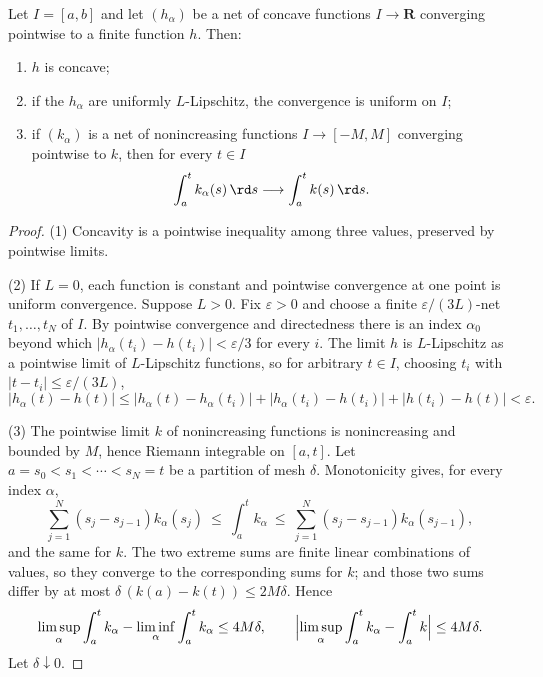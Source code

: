 \begin{lemma}
\label{lem:ch27-concave-nets}
Let $I=[a,b]$ and let $(h_\alpha)$ be a net of concave functions
$I\to\mathbf R$ converging pointwise to a finite function $h$.  Then:
\begin{enumerate}
\item $h$ is concave;
\item if the $h_\alpha$ are uniformly $L$-Lipschitz, the convergence is
uniform on $I$;
\item if $(k_\alpha)$ is a net of nonincreasing functions
$I\to[-M,M]$ converging pointwise to $k$, then for every
$t\in I$
\begin{equation}\label{eq:ch27-helly-integral}
 \int_a^tk_\alpha(s)\,\rd s\longrightarrow\int_a^tk(s)\,\rd s .
\end{equation}
\end{enumerate}
\end{lemma}

\begin{proof}
(1) Concavity is a pointwise inequality among three values, preserved by
pointwise limits.

(2) If $L=0$, each function is constant and pointwise convergence at one
point is uniform convergence.  Suppose $L>0$.  Fix $\varepsilon>0$ and
choose a finite $\varepsilon/(3L)$-net
$t_1,\dots,t_N$ of $I$.  By pointwise convergence and directedness there
is an index $\alpha_0$ beyond which $|h_\alpha(t_i)-h(t_i)|<\varepsilon/3$
for every $i$.  The limit $h$ is $L$-Lipschitz as a pointwise limit of
$L$-Lipschitz functions, so for arbitrary $t\in I$, choosing $t_i$
with $|t-t_i|\leq\varepsilon/(3L)$,
\[
 |h_\alpha(t)-h(t)|
 \leq|h_\alpha(t)-h_\alpha(t_i)|+|h_\alpha(t_i)-h(t_i)|+|h(t_i)-h(t)|
 <\varepsilon .
\]

(3) The pointwise limit $k$ of nonincreasing functions is nonincreasing
and bounded by $M$, hence Riemann integrable on $[a,t]$.  Let
$a=s_0<s_1<\cdots<s_N=t$ be a partition of mesh $\delta$.  Monotonicity
gives, for every index $\alpha$,
\[
 \sum_{j=1}^N(s_j-s_{j-1})k_\alpha(s_j)
 \ \leq\ \int_a^tk_\alpha
 \ \leq\ \sum_{j=1}^N(s_j-s_{j-1})k_\alpha(s_{j-1}),
\]
and the same for $k$.  The two extreme sums are finite linear
combinations of values, so they converge to the corresponding sums for
$k$; and those two sums differ by at most
$\delta\,(k(a)-k(t))\leq2M\delta$.  Hence
\[
 \limsup_\alpha\int_a^tk_\alpha-\liminf_\alpha\int_a^tk_\alpha\leq4M\delta,
 \qquad
 \Bigl|\limsup_\alpha\int_a^tk_\alpha-\int_a^tk\Bigr|\leq4M\delta .
\]
Let $\delta\downarrow0$.
\end{proof}

